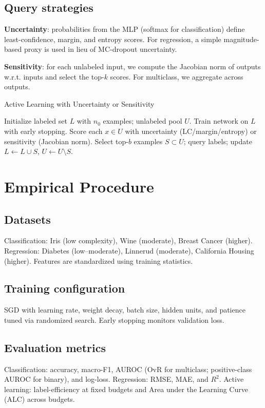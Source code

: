 \documentclass[conference]{IEEEtran}
\begin{document}
\subsection{Query strategies}
\textbf{Uncertainty}: probabilities from the MLP (softmax for classification) define least-confidence, margin, and entropy scores. For regression, a simple magnitude-based proxy is used in lieu of MC-dropout uncertainty.

\textbf{Sensitivity}: for each unlabeled input, we compute the Jacobian norm of outputs w.r.t. inputs and select the top-$k$ scores. For multiclass, we aggregate across outputs.

\begin{algorithm}[t]
\caption{Active Learning with Uncertainty or Sensitivity}
\label{alg:al}
\begin{algorithmic}[1]
\State Initialize labeled set $L$ with $n_0$ examples; unlabeled pool $U$.
  \State Train network on $L$ with early stopping.
  \State Score each $x\in U$ with uncertainty (LC/margin/entropy) or sensitivity (Jacobian norm).
  \State Select top-$b$ examples $S\subset U$; query labels; update $L\leftarrow L\cup S$, $U\leftarrow U\setminus S$.
\EndWhile
\end{algorithmic}
\end{algorithm}

\section{Empirical Procedure}
\subsection{Datasets}
Classification: Iris (low complexity), Wine (moderate), Breast Cancer (higher). Regression: Diabetes (low–moderate), Linnerud (moderate), California Housing (higher). Features are standardized using training statistics.

\subsection{Training configuration}
SGD with learning rate, weight decay, batch size, hidden units, and patience tuned via randomized search. Early stopping monitors validation loss.

\subsection{Evaluation metrics}
Classification: accuracy, macro-F1, AUROC (OvR for multiclass; positive-class AUROC for binary), and log-loss. Regression: RMSE, MAE, and $R^2$. Active learning: label-efficiency at fixed budgets and Area under the Learning Curve (ALC) across budgets.
\end{document}
